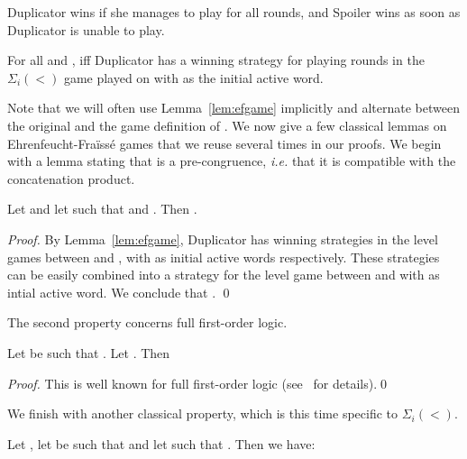 \documentclass[envcountsame]{llncs}
\newcommand{\efgame}{Ehrenfeucht-Fra\"iss\'e\xspace}
\newcommand{\siw}[1]{\ensuremath{\Sigma_{#1}(<)}\xspace}
\begin{document}
Duplicator wins if she manages to play for all  rounds, and Spoiler
wins as soon as Duplicator is unable to play.

\begin{lemma}[Folklore] \label{lem:efgame}
  For all  and ,  iff
  Duplicator has a winning strategy for playing  rounds in the
  \siw{i} game played on  with  as the initial active word.
\end{lemma}

Note that we will often use Lemma~\ref{lem:efgame} implicitly and
alternate between the original and the game definition of
. We now give a few classical lemmas on \efgame games that
we reuse several times in our proofs. We begin with a 
lemma stating that  is a pre-congruence, \emph{i.e.} that it is
compatible with the concatenation product.

\begin{lemma} \label{lem:efconcat}
  Let  and let  such that  and . Then .
\end{lemma}

\begin{proof}
  By Lemma~\ref{lem:efgame}, Duplicator has winning strategies in the level
   games between  and , with  as initial
  active words respectively. These strategies can be easily combined into a
  strategy for the level  game between  and  with
   as intial active word. We conclude that . \qed
\end{proof}

The second property concerns full first-order logic.

\begin{lemma} \label{lem:aperiodic} Let  be such that
  . Let . Then
  
\end{lemma}

\begin{proof}
  This is well known for full first-order logic
  (see~\cite{bookstraub} for details).\qed
\end{proof}

We finish with another classical property, which is this time specific
to \siw{i}.

\begin{lemma} \label{lem:siprop}
  Let , let  be such
  that  and let  such that . Then we have:
  
\end{lemma}
\end{document}
